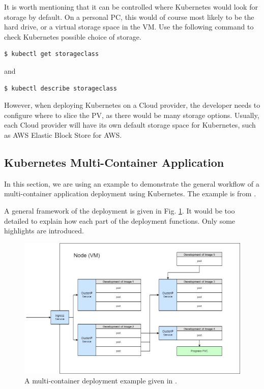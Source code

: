 It is worth mentioning that it can be controlled where Kubernetes would look for storage by default. On a personal PC, this would of course most likely to be the hard drive, or a virtual storage space in the VM. Use the following command to check Kubernetes possible choice of storage.
\begin{lstlisting}
$ kubectl get storageclass
\end{lstlisting}
and 
\begin{lstlisting}
$ kubectl describe storageclass
\end{lstlisting}
However, when deploying Kubernetes on a Cloud provider, the developer needs to configure where to slice the PV, as there would be many storage options. Usually, each Cloud provider will have its own default storage space for Kubernetes, such as AWS Elastic Block Store for AWS.





\subsection{Kubernetes Multi-Container Application}

In this section, we are using an example to demonstrate the general workflow of a multi-container application deployment using Kubernetes. The example is from \cite{stephen2023docker}.

A general framework of the deployment is given in Fig. \ref{ch:vac:fig:multipodk8s}. It would be too detailed to explain how each part of the deployment functions. Only some highlights are introduced.
\begin{figure}
	\centering
	\includegraphics[width=350pt]{chapters/ch-virtualization-and-containerization/figures/multipodk8s.png}
	\caption{A multi-container deployment example given in \cite{stephen2023docker}.} \label{ch:vac:fig:multipodk8s}
\end{figure}

